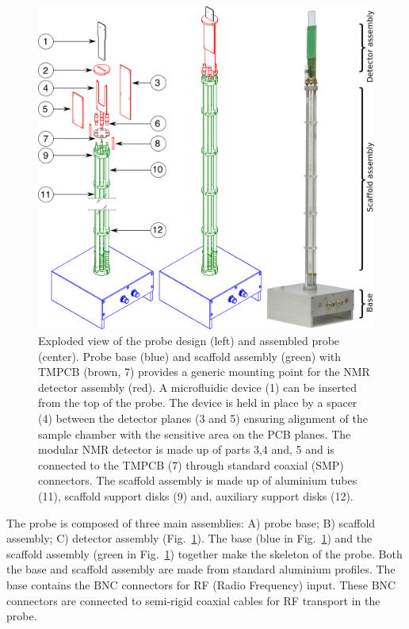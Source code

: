 \documentclass[preprint,5p]{elsarticle}
\newcommand{\fig}[1]{Fig.~\ref{#1}}
\begin{document}
\begin{figure}
\centering
\includegraphics[width=.8\linewidth,keepaspectratio=true]{./figures/ms5n17-tlp-im-181007-Probe-explode.png}
\caption{Exploded view of the probe design (left) and assembled probe (center).
Probe base (blue) and scaffold assembly (green) with TMPCB (brown, 7) provides a
generic mounting point for the NMR detector assembly (red).
A microfluidic device (1) can be inserted from the top of the probe.
The device is held in place by a spacer (4) between the detector planes (3 and 5)
ensuring alignment of the sample chamber with the sensitive area on the PCB planes.
The modular NMR detector is made up of parts 3,4 and, 5 and is
connected to the TMPCB (7) through standard coaxial (SMP) connectors.
The scaffold assembly is made up of aluminium tubes (11), scaffold support disks (9)
and, auxiliary support disks (12).}
\label{fig:probe-explode}
\end{figure}

The probe is composed of three main assemblies: A) probe base; B) scaffold assembly;
C) detector assembly (\fig{fig:probe-explode}).
The  base (blue in \fig{fig:probe-explode}) and the scaffold assembly
(green in \fig{fig:probe-explode}) together make the skeleton of the probe.
Both the base and scaffold assembly are made from standard aluminium profiles.
The base contains the BNC connectors for RF (Radio Frequency) input.
These BNC connectors are connected to semi-rigid coaxial cables for
RF transport in the probe.
\end{document}
